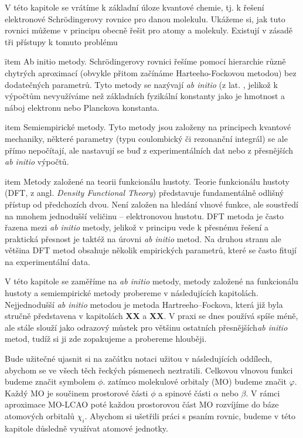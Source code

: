 V této kapitole se vrátíme k základní úloze kvantové chemie, tj. k řešení elektronové Schr\"{o}dingerovy rovnice pro danou molekulu. Ukážeme si, jak tuto rovnici můžeme v principu obecně řešit pro atomy a molekuly.  Existují v zásadě tři přístupy k tomuto problému


ïtem Ab initio metody.  Schr\"{o}dingerovy  rovnici řešíme pomocí hierarchie různě chytrých aproximací (obvykle přitom začínáme Harteeho-Fockovou metodou) bez dodatečných parametrů. Tyto metody se nazývají \textit{ab initio} (z lat. , jelikož k výpočtům nevyužíváme než základních fyzikální konstanty jako je hmotnost a náboj elektronu nebo Planckova konstanta. 

item Semiempirické metody. Tyto metody jsou založeny na principech kvantové mechaniky, některé parametry (typu coulombický či rezonanční integrál) se ale přímo nepočítají, ale nastavují se buď z experimentálních dat nebo z přesnějších \textit{ab initio} výpočtů.

item Metody založené na teorii funkcionálu hustoty.  Teorie funkcionálu hustoty (DFT, z angl. \textit{Density Functional Theory}) představuje fundamentálně odlišný přístup od předchozích dvou. Není založen na hledání vlnové funkce, ale soustředí na mnohem jednodušší veličinu -- elektronovou hustotu. DFT metoda je často řazena mezi \textit{ab initio} metody, jelikož v principu vede k přesnému řešení a praktická přesnost je taktéž na úrovni \textit{ab initio} metod. Na druhou stranu ale většina DFT metod obsahuje několik empirických parametrů, které se často fitují na experimentální data.    

V této kapitole se zaměříme na \textit{ab initio} metody, metody založené na funkcionálu hustoty a semiempirické metody probereme v následujících kapitolách. Nejjednodušší \textit{ab initio} metodou je metoda Hartreeho--Fockova, která již byla stručně představena v kapitolách \textbf{XX} a \textbf{XX}. V praxi se dnes používá spíše méně, ale stále slouží jako odrazový můstek pro většinu ostatních přesnějších\textit{ab initio} metod, tudíž si ji zde zopakujeme a probereme hlouběji.

Bude užitečné ujasnit si na začátku notaci užitou v následujících oddílech, abychom se ve všech těch řeckých písmenech neztratili. Celkovou vlnovou funkci budeme značit symbolem $\phi$.  zatímco molekulové orbitaly (MO) budeme značit $\varphi$. Každý MO je součinem prostorové části $\phi$ a spinové části $\alpha$ nebo $\beta$. V rámci aproximace MO-LCAO poté každou prostorovou část MO rozvíjíme do báze atomových orbitalů $\chi_i$. Abychom si ušetřili práci s psaním rovnic, budeme v této kapitole důsledně využívat atomové jednotky.

